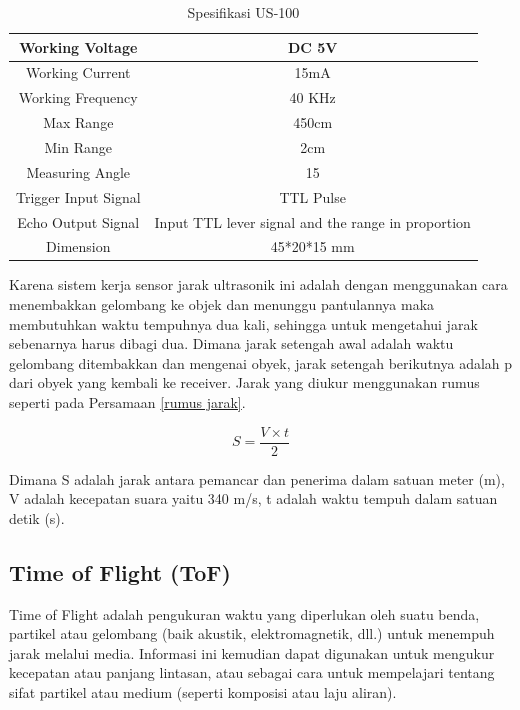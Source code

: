 \begin{table}[h!]\label{tbl:spekUS100}
	\caption{Spesifikasi US-100}
	\centering
	\begin{tabular}{|c|c|}
		\hline
		Working Voltage & DC 5V \\
		\hline
		Working Current & 15mA \\
		\hline
		Working Frequency & 40 KHz \\
		\hline
		Max Range & 450cm \\
		\hline
		Min Range & 2cm \\
		\hline
		Measuring Angle & 15 \\
		\hline
		Trigger Input Signal &  TTL Pulse \\
		\hline
		Echo Output Signal & Input TTL lever signal and the range in proportion \\
		\hline
		Dimension & 45*20*15 mm \\
		\hline
	\end{tabular}
\end{table}

Karena sistem kerja sensor jarak ultrasonik ini adalah dengan menggunakan cara menembakkan gelombang ke objek dan menunggu 
pantulannya maka membutuhkan waktu tempuhnya dua kali, sehingga untuk mengetahui jarak sebenarnya harus dibagi dua. Dimana 
jarak setengah awal adalah waktu gelombang ditembakkan dan mengenai obyek, jarak setengah berikutnya adalah p dari obyek yang kembali ke receiver. 
Jarak yang diukur menggunakan rumus seperti pada Persamaan \ref*{rumus jarak}.


\begin{equation}\label{rumus jarak}
	 S= \frac{V \times t}{2} 
\end{equation}

Dimana S adalah jarak antara pemancar dan penerima dalam satuan meter (m), V adalah kecepatan suara yaitu 340 m/s, t adalah 
waktu tempuh dalam satuan detik (s).

\subsection{Time of Flight (ToF)}

Time of Flight adalah pengukuran waktu yang diperlukan oleh suatu benda, partikel atau gelombang (baik akustik, elektromagnetik, 
dll.) untuk menempuh jarak melalui media. Informasi ini kemudian dapat digunakan untuk mengukur kecepatan atau panjang lintasan, 
atau sebagai cara untuk mempelajari tentang sifat partikel atau medium (seperti komposisi atau laju aliran). 

